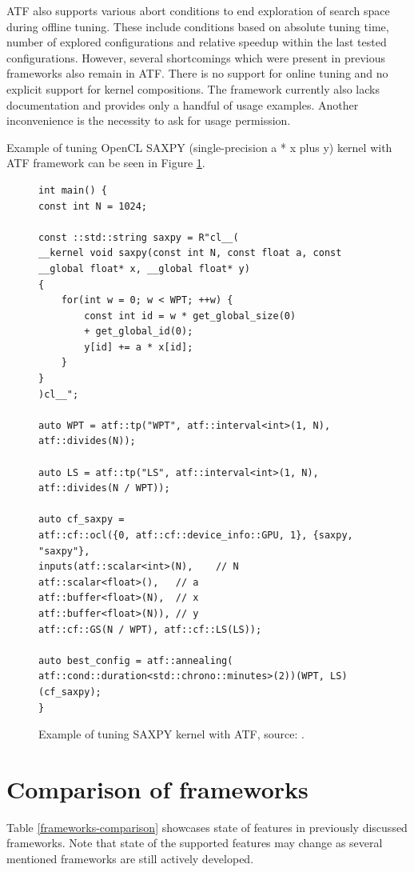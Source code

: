 \documentclass
[
    digital, %
    oneside, %
    table, %
    nolof, %
    nolot, %
    nocover %
]{fithesis3}
\begin{document}
ATF also supports various abort conditions to end exploration of search space during offline tuning. These include conditions based on absolute tuning
time, number of explored configurations and relative speedup within the last tested configurations. However, several shortcomings which were present
in previous frameworks also remain in ATF. There is no support for online tuning and no explicit support for kernel compositions. The framework currently
also lacks documentation and provides only a handful of usage examples. Another inconvenience is the necessity to ask for usage permission.

Example of tuning OpenCL SAXPY (single-precision a * x plus y) kernel with ATF framework can be seen in Figure \ref{atf-example}.

\begin{figure}
\begin{adjustwidth}{-1cm}{-1cm}
\begin{lstlisting}
int main() {
const int N = 1024;

const ::std::string saxpy = R"cl__( 
__kernel void saxpy(const int N, const float a, const __global float* x, __global float* y)
{       
    for(int w = 0; w < WPT; ++w) {
        const int id = w * get_global_size(0) 
        + get_global_id(0);
        y[id] += a * x[id];
    }
}
)cl__";

auto WPT = atf::tp("WPT", atf::interval<int>(1, N), atf::divides(N));

auto LS = atf::tp("LS", atf::interval<int>(1, N), atf::divides(N / WPT));

auto cf_saxpy =
atf::cf::ocl({0, atf::cf::device_info::GPU, 1}, {saxpy, "saxpy"},
inputs(atf::scalar<int>(N),    // N
atf::scalar<float>(),   // a
atf::buffer<float>(N),  // x
atf::buffer<float>(N)), // y
atf::cf::GS(N / WPT), atf::cf::LS(LS));

auto best_config = atf::annealing(
atf::cond::duration<std::chrono::minutes>(2))(WPT, LS)(cf_saxpy);
}
\end{lstlisting}
\caption{Example of tuning SAXPY kernel with ATF, source: \cite{atf-example}.}
\label{atf-example}
\end{adjustwidth}
\end{figure}

\section{Comparison of frameworks}
Table \ref{frameworks-comparison} showcases state of features in previously discussed frameworks. Note that state of the supported features may change
as several mentioned frameworks are still actively developed.
\end{document}
